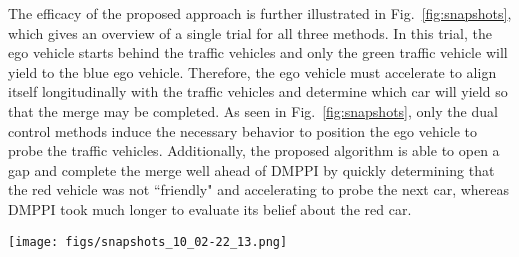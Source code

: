 \documentclass[letterpaper, 10 pt, conference]{IEEEconf}
\begin{document}
The efficacy of the proposed approach is further illustrated in Fig.~\ref{fig:snapshots}, which gives an overview of a single trial for all three methods.
In this trial, the ego vehicle starts behind the traffic vehicles and only the green traffic vehicle will yield to the blue ego vehicle. 
Therefore, the ego vehicle must accelerate to align itself longitudinally with the traffic vehicles and determine which car will yield so that the merge may be completed.
As seen in Fig.~\ref{fig:snapshots}, only the dual control methods induce the necessary behavior to position the ego vehicle to probe the traffic vehicles.
Additionally, the proposed algorithm is able to open a gap and complete the merge well ahead of DMPPI by quickly determining that the red vehicle was not ``friendly" and accelerating to probe the next car, whereas DMPPI took much longer to evaluate its belief about the red car.

\begin{figure*}[ht]
    \centering
    \texttt{[image: figs/snapshots\_10\_02-22\_13.png]}
    \caption{Depiction of single trial for proposed and baseline methods.}
    \label{fig:snapshots}
\end{figure*}
\end{document}
